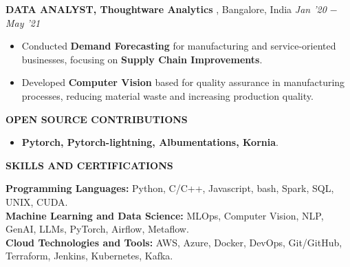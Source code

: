 \documentclass[10pt,a4]{article}
\begin{document}
{\begin{flushleft}
    \textbf{\large DATA ANALYST, Thoughtware Analytics },  Bangalore, India \hfill \textit{\large Jan '20 $-$ May '21}	\\		
    \begin{itemize}
          
        \item Conducted \textbf{Demand Forecasting} for manufacturing and service-oriented businesses, focusing on \textbf{Supply Chain Improvements}.
        \item Developed \textbf{Computer Vision} based for quality assurance in manufacturing processes, reducing material waste and increasing production quality.   
    \end{itemize}
    
\end{flushleft}

\begin{flushleft}
    \textbf{\large OPEN SOURCE CONTRIBUTIONS}
    \begin{itemize}
        \item \textbf{Pytorch, Pytorch-lightning, Albumentations, Kornia}.
    \end{itemize}
\end{flushleft}



\begin{flushleft}
    {\large \textbf {SKILLS AND CERTIFICATIONS}}
    
        \vspace{1mm}
            \hspace{0.5cm}  \textbf{Programming Languages:} Python, C/C++, Javascript, bash, Spark, SQL, UNIX, CUDA. \\
            \hspace{0.5cm}  \textbf{Machine Learning and Data Science:} MLOps, Computer Vision, NLP, GenAI, LLMs, PyTorch, Airflow, Metaflow. \\
            \hspace{0.5cm}  \textbf{Cloud Technologies and Tools:} AWS, Azure, Docker, DevOps, Git/GitHub, Terraform, Jenkins, Kubernetes, Kafka. \\
        


\end{flushleft}}
\end{document}
